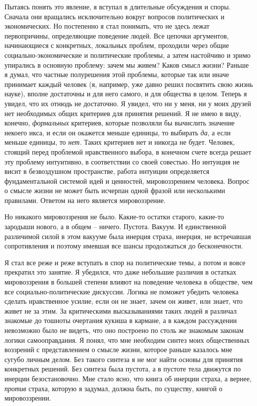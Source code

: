 \documentclass{book}
\begin{document}
Пытаясь понять это явление, я вступал в длительные обсуж­дения и споры. Сначала они вращались исключительно вокруг вопросов политических и экономических. Но постепенно я стал понимать, что не здесь лежат первопричины, определяющие поведение людей. Все цепочки аргументов, начинающиеся с конкретных, локальных проблем, проходили через общие социально-экономические и политические проблемы, а затем настойчиво и зримо упирались в основную проблему: зачем мы живем? Каков смысл жизни? Раньше я думал, что частные полурешения этой проблемы, которые так или иначе принимает каждый человек (я, например, уже давно решил посвятить свою жизнь науке), вполне достаточны и для него самого, и для общества в целом. Теперь я увидел, что их отнюдь не достаточно. Я увидел, что ни у меня, ни у моих друзей нет необходимых общих критериев для принятия решений. Я не имею в виду, конечно, \textit{формальных}  критериев, которые позволяли бы вычислить значение некоего икса, и если он окажется меньше единицы, то выбирать \textit{да},  а если меньше единицы,  то \textit{нет.}  Таких критериев нет и никогда не будет. Человек, стоящий перед проблемой нравственного выбора, в конечном счете всегда решает эту проблему интуитивно, в соответствии со своей совестью. Но интуиция не висит в безвоздушном пространстве, работа интуиции определяется фундаментальной системой идей и цен­ностей, мировоззрением человека. Вопрос о смысле жизни не может быть исчерпан одной фразой или несколькими правилами. Ответом на него является мировоззрение.

Но никакого мировоззрения не было. Какие-то остатки старого, какие-то зародыши нового, а в общем -- ничего. Пустота. Вакуум. И единственной различимой силой в этом вакууме была инерция страха, инерция, не встречавшая сопротивления и поэтому имевшая все шансы продолжаться до бесконечности.

Я стал все реже и реже вступать в спор на политические те­мы, а потом и вовсе прекратил это занятие. Я убедился, что да­же небольшие различия в остатках мировоззрения в большей степени влияют на поведение человека в обществе, чем все со­циально-политические дискуссии. Логика не поможет убедить человека сделать нравственное усилие, если он не знает, зачем он живет, или знает, что живет не за этим. За критическими вы­сказываниями таких людей я различал знакомые до тошноты очертания кукиша в кармане, а в каждом рассуждении невоз­можно было не видеть, что оно построено по столь же знакомым законам логики самооправдания. Я понял, что мне необходим синтез моих общественных воззрений с представлением о смыс­ле жизни, которое раньше казалось мне сугубо личным делом. Без такого синтеза я не мог найти основы для принятия кон­кретных решений. Без синтеза была пустота, а в пустоте тела движутся по инерции безостановочно. Мне стало ясно, что книга об инерции страха, а вернее, \textit{против}  страха, которую я задумал, должна быть, по существу, книгой о мировоззрении.
\end{document}
